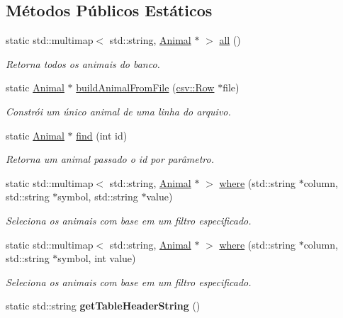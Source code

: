 \subsection*{Métodos Públicos Estáticos}
\begin{DoxyCompactItemize}
\item 
static std\+::multimap$<$ std\+::string, \hyperlink{classAnimal}{Animal} $\ast$ $>$ \hyperlink{classAnimal_a342dd3f74afeeadd169e792db6f04845}{all} ()
\begin{DoxyCompactList}\small\item\em Retorna todos os animais do banco. \end{DoxyCompactList}\item 
static \hyperlink{classAnimal}{Animal} $\ast$ \hyperlink{classAnimal_a8b0e3217c72fa8de0316828c6385dd99}{build\+Animal\+From\+File} (\hyperlink{classcsv_1_1Row}{csv\+::\+Row} $\ast$file)
\begin{DoxyCompactList}\small\item\em Constrói um único animal de uma linha do arquivo. \end{DoxyCompactList}\item 
static \hyperlink{classAnimal}{Animal} $\ast$ \hyperlink{classAnimal_aac52a938d9c55280467c9f6e9564df95}{find} (int id)
\begin{DoxyCompactList}\small\item\em Retorna um animal passado o id por parâmetro. \end{DoxyCompactList}\item 
static std\+::multimap$<$ std\+::string, \hyperlink{classAnimal}{Animal} $\ast$ $>$ \hyperlink{classAnimal_a42e0c72ec2c9881cbf5d1be57c418cc5}{where} (std\+::string $\ast$column, std\+::string $\ast$symbol, std\+::string $\ast$value)
\begin{DoxyCompactList}\small\item\em Seleciona os animais com base em um filtro especificado. \end{DoxyCompactList}\item 
static std\+::multimap$<$ std\+::string, \hyperlink{classAnimal}{Animal} $\ast$ $>$ \hyperlink{classAnimal_a82f0fbbdb2064d8235e9037e48f706b3}{where} (std\+::string $\ast$column, std\+::string $\ast$symbol, int value)
\begin{DoxyCompactList}\small\item\em Seleciona os animais com base em um filtro especificado. \end{DoxyCompactList}\item 
\mbox{\label{classAnimal_a2f13aabfb0786caf442098b1614ae58d}} 
static std\+::string {\bfseries get\+Table\+Header\+String} ()
\end{DoxyCompactItemize}
